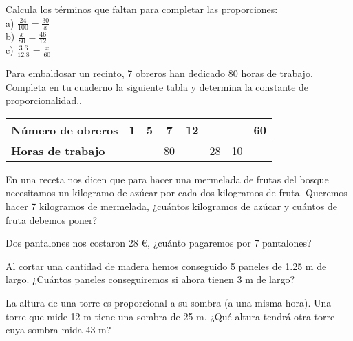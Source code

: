 \begin{ejer}
Calcula los términos que faltan para completar las proporciones: \\
a) $\frac{24}{100} = \frac{30}{x}$ \\
b) $\frac{x}{80}=\frac{46}{12}$ \\
c) $\frac{3.6}{12.8} = \frac{x}{60}$
\end{ejer}

\begin{ejer}
Para embaldosar un recinto, 7 obreros han dedicado 80 horas de trabajo. Completa en tu cuaderno la siguiente tabla y determina la constante de proporcionalidad..
\end{ejer}

\begin{table}[!h]
\begin{center}
\begin{tabularx}{\textwidth}{|X | c | c | c | c | c| c | c|} 
 \hline
 \textbf{Número de obreros} & 1 & 5 & 7 & 12 &  &  & 60 \\
 \hline
 \textbf{Horas de trabajo} &  &  & 80 &  & 28 & 10 & \\
 \hline 
\end{tabularx}
\end{center}
\end{table}

\begin{ejer}
En una receta nos dicen que para hacer una mermelada de frutas del bosque necesitamos un kilogramo de azúcar por cada dos kilogramos de fruta. Queremos hacer 7 kilogramos de mermelada, ¿cuántos kilogramos de azúcar y cuántos de fruta debemos poner?
\end{ejer}

\begin{ejer}
Dos pantalones nos costaron 28 €, ¿cuánto pagaremos por 7 pantalones?
\end{ejer}

\begin{ejer}
Al cortar una cantidad de madera hemos conseguido 5 paneles de 1.25 m de largo. ¿Cuántos paneles conseguiremos si ahora tienen 3 m de largo?
\end{ejer}

\begin{ejer}
La altura de una torre es proporcional a su sombra (a una misma hora). Una torre que mide 12 m tiene una sombra de 25 m. ¿Qué altura tendrá otra torre cuya sombra mida 43 m?
\end{ejer}

